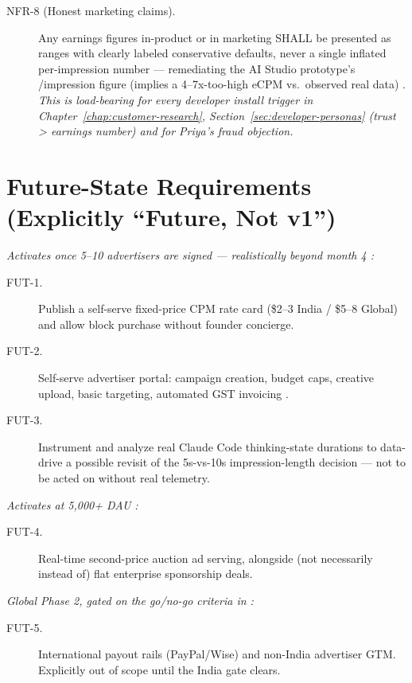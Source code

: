 \begin{description}
\item[NFR-8 (Honest marketing claims).] Any earnings figures in-product or in marketing SHALL be presented as ranges with clearly labeled conservative defaults, never a single inflated per-impression number --- remediating the AI Studio prototype's /impression figure (implies a 4--7x-too-high eCPM vs.\ observed real data) \cite{prd_2026}. \emph{This is load-bearing for every developer install trigger in Chapter~\ref{chap:customer-research}, Section~\ref{sec:developer-personas} (trust > earnings number) and for Priya's fraud objection.}
\end{description}

\section{Future-State Requirements (Explicitly ``Future, Not v1'')}
\label{sec:future-requirements}

\emph{Activates once 5--10 advertisers are signed --- realistically beyond month 4 \cite{masterplan_2026}:}
\begin{description}
\item[FUT-1.] Publish a self-serve fixed-price CPM rate card (\$2--3 India / \$5--8 Global) and allow block purchase without founder concierge.
\item[FUT-2.] Self-serve advertiser portal: campaign creation, budget caps, creative upload, basic targeting, automated GST invoicing \cite{mvpspec_2026}.
\item[FUT-3.] Instrument and analyze real Claude Code thinking-state durations to data-drive a possible revisit of the 5s-vs-10s impression-length decision \cite{masterplan_2026} --- not to be acted on without real telemetry.
\end{description}

\emph{Activates at 5{,}000+ DAU \cite{masterplan_2026}:}
\begin{description}
\item[FUT-4.] Real-time second-price auction ad serving, alongside (not necessarily instead of) flat enterprise sponsorship deals.
\end{description}

\emph{Global Phase 2, gated on the go/no-go criteria in \cite{masterplan_2026}:}
\begin{description}
\item[FUT-5.] International payout rails (PayPal/Wise) and non-India advertiser GTM. Explicitly out of scope until the India gate clears.
\end{description}


